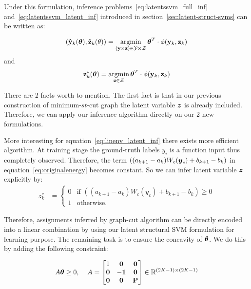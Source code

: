 \documentclass[sigconf, anonymous, review]{acmart}
\begin{document}
Under this formulation, inference
problems~\eqref{eq:latentssvm_full_inf}
and~\eqref{eq:latentssvm_latent_inf} introduced in
section~\ref{sec:latent-struct-svms} can be written as:

\begin{align}
  \label{eq:linenv_full_inf}
  (\mathbf{\hat{y}}_k(\boldsymbol{\theta}),\mathbf{\hat{z}}_k(\theta))=\mathop{\textrm{argmin}}_{(\mathbf{y}
  \times \mathbf{z}) \in \mathcal{Y} \times \mathcal{Z}}
  \boldsymbol{\theta}^T\cdot\phi(\mathbf{y}_k,\mathbf{z}_k)
\end{align}
and
\begin{align}
  \label{eq:linenv_latent_inf}
  \mathbf{z}^*_k(\boldsymbol{\theta}) = \mathop{\textrm{argmin}}_{\mathbf{z} \in \mathcal{Z}}
  \boldsymbol{\theta}^T \cdot \phi(\mathbf{y}_k,\mathbf{z}_k)
\end{align}

There are 2 facts worth to mention. The first fact is
that in our previous construction of minimum-$st$-cut graph the
latent variable ${\boldsymbol{z}}$ is already included. Therefore, we can
apply our inference algorithm directly on our 2 new formulations.

More interesting for equation~\eqref{eq:linenv_latent_inf} there exists
more efficient algorithm. At training stage the ground-truth
labels $y_i$ is a function input thus completely observed.
Therefore, the term $((a_{k+1}-a_k)W_c({\boldsymbol{y}}_c)+b_{k+1}-b_k)$ in
equation~\eqref{eq:originalenergy} becomes constant. So we can
infer latent variable ${\boldsymbol{z}}$ explicitly by:
\begin{align}
  \label{eq:linenv_effi_infer_latent}
  z_k^c &=
          \begin{cases}
            0 & \text{if $((a_{k+1}-a_k)W_c(y_c)+b_{k+1}-b_k)\geq0$} \\
            1 & \text{otherwise}.
          \end{cases}
\end{align}

Therefore, assignments inferred by graph-cut algorithm can be
directly encoded into a linear combination by using our latent
structural SVM formulation for learning purpose. The remaining
task is to ensure the concavity of $\boldsymbol{\theta}$. We do this by
adding the following constraint:

\begin{align}
  A\boldsymbol{\theta}\geq0 \text{,\;~~~} A=
                  \begin{bmatrix}
                    1 & \mathbf{0} & \mathbf{0}\\
                    \mathbf{0} & -\mathbf{1} & \mathbf{0}\\
                    \mathbf{0} & \mathbf{0} & \mathbf{P}
                  \end{bmatrix}\in \mathbb{R}^{(2K-1)\times(2K-1)}
\end{align}
\end{document}
